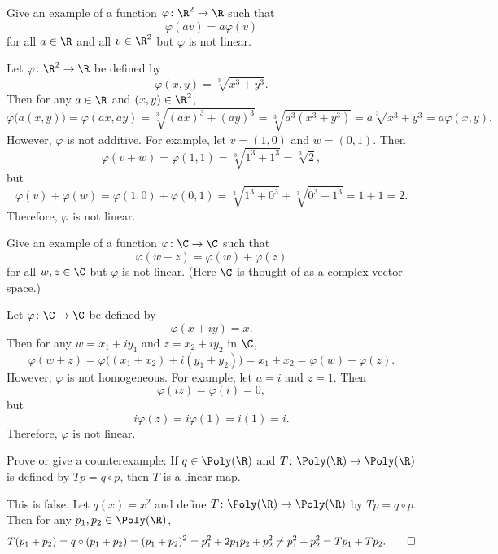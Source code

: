 \begin{exc}
\begin{exercise}
Give an example of a function $\varphi\colon\R^2\to\R$ such that
\[ \varphi(av)=a\varphi(v) \]
for all $a\in\R$ and all $v\in\R^2$ but $\varphi$ is not linear.
\end{exercise}
\begin{solution}

Let $\varphi\colon\R^2\to\R$ be defined by
\[ \varphi(x,y)=\sqrt[3]{x^3+y^3}. \]
Then for any $a\in\R$ and $(x,y)\in\R^2$,
\[ \varphi\bigl(a(x,y)\bigr)=\varphi(ax,ay)=\sqrt[3]{(ax)^3+(ay)^3}
   =\sqrt[3]{a^3(x^3+y^3)}=a\sqrt[3]{x^3+y^3}=a\varphi(x,y). \]
However, $\varphi$ is not additive. For example, let $v=(1,0)$ and $w=(0,1)$.
Then
\[ \varphi(v+w)=\varphi(1,1)=\sqrt[3]{1^3+1^3}=\sqrt[3]{2}, \]
but
\[ \varphi(v)+\varphi(w)=\varphi(1,0)+\varphi(0,1)
   =\sqrt[3]{1^3+0^3}+\sqrt[3]{0^3+1^3}=1+1=2. \]
Therefore, $\varphi$ is not linear.
\end{solution}

\begin{exercise}
Give an example of a function $\varphi\colon\C\to\C$ such that
\[ \varphi(w+z)=\varphi(w)+\varphi(z) \]
for all $w,z\in\C$ but $\varphi$ is not linear. (Here $\C$ is thought of as a
complex vector space.)
\end{exercise}
\begin{solution}
Let $\varphi\colon\C\to\C$ be defined by
\[ \varphi(x+iy)=x. \]
Then for any $w=x_1+iy_1$ and $z=x_2+iy_2$ in $\C$,
\[ \varphi(w+z)=\varphi\bigl((x_1+x_2)+i(y_1+y_2)\bigr)=x_1+x_2
   =\varphi(w)+\varphi(z). \]
However, $\varphi$ is not homogeneous. For example, let $a=i$ and $z=1$. Then
\[ \varphi(iz)=\varphi(i)=0, \]
but
\[ i\varphi(z)=i\varphi(1)=i(1)=i. \]
Therefore, $\varphi$ is not linear.
\end{solution}

\begin{exercise}
Prove or give a counterexample: If $q\in\Poly(\R)$ and
$T\colon\Poly(\R)\to\Poly(\R)$ is defined by $Tp=q\circ p$, then $T$ is a
linear map.
\end{exercise}
\begin{solution}
This is false. Let $q(x)=x^2$ and define $T\colon\Poly(\R)\to\Poly(\R)$ by
$Tp=q\circ p$. Then for any $p_1,p_2\in\Poly(\R)$,
\[ T(p_1+p_2)=q\circ(p_1+p_2)=(p_1+p_2)^2=p_1^2+2p_1p_2+p_2^2
   \ne p_1^2+p_2^2=Tp_1+Tp_2. \qedhere \]
\end{solution}


\end{exc}
